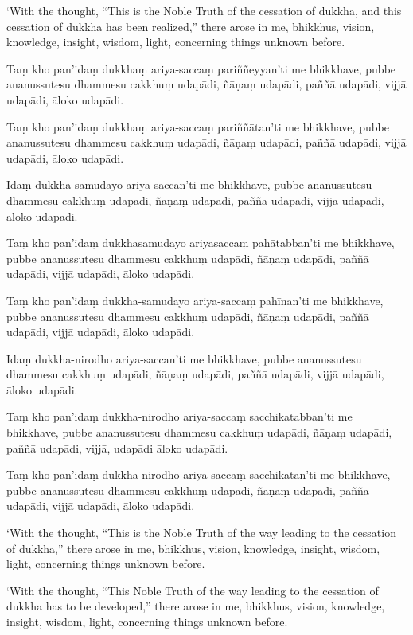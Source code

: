 ‘With the thought, “This is the Noble Truth of the cessation of dukkha,
and this cessation of dukkha has been realized,” there arose in me,
bhikkhus, vision, knowledge, insight, wisdom, light, concerning things
unknown before.

\clearpage

\paliText
\markboth{\paliTitle}{\rightmark}

Taṃ kho pan'idaṃ dukkhaṃ ariya-saccaṃ pariññeyyan'ti me bhikkhave, pubbe
ananussutesu dhammesu cakkhuṃ udapādi, ñāṇaṃ udapādi, paññā udapādi,
vijjā udapādi, āloko udapādi.

Taṃ kho pan'idaṃ dukkhaṃ ariya-saccaṃ pariññātan'ti me bhikkhave, pubbe
ananussutesu dhammesu cakkhuṃ udapādi, ñāṇaṃ udapādi, paññā udapādi,
vijjā udapādi, āloko udapādi.

Idaṃ dukkha-samudayo ariya-saccan'ti me bhikkhave, pubbe ananussutesu
dhammesu cakkhuṃ udapādi, ñāṇaṃ udapādi, paññā udapādi, vijjā udapādi,
āloko udapādi.

Taṃ kho pan'idaṃ dukkhasamudayo ariyasaccaṃ pahātabban'ti me bhikkhave,
pubbe ananussutesu dhammesu cakkhuṃ udapādi, ñāṇaṃ udapādi, paññā
udapādi, vijjā udapādi, āloko udapādi.

Taṃ kho pan'idaṃ dukkha-samudayo ariya-saccaṃ pahīnan'ti me bhikkhave, pubbe
ananussutesu dhammesu cakkhuṃ udapādi, ñāṇaṃ udapādi, paññā udapādi,
vijjā udapādi, āloko udapādi.

Idaṃ dukkha-nirodho ariya-saccan'ti me bhikkhave, pubbe ananussutesu
dhammesu cakkhuṃ udapādi, ñāṇaṃ udapādi, paññā udapādi, vijjā udapādi,
āloko udapādi.

Taṃ kho pan'idaṃ dukkha-nirodho ariya-saccaṃ sacchikātabban'ti me bhikkhave,
pubbe ananussutesu dhammesu cakkhuṃ udapādi, ñāṇaṃ udapādi, paññā
udapādi, vijjā, udapādi āloko udapādi.

Taṃ kho pan'idaṃ dukkha-nirodho ariya-saccaṃ sacchikatan'ti me bhikkhave,
pubbe ananussutesu dhammesu cakkhuṃ udapādi, ñāṇaṃ udapādi, paññā
udapādi, vijjā udapādi, āloko udapādi.

\clearpage

\englishText
\markboth{\englishTitle}{\rightmark}

‘With the thought, “This is the Noble Truth of the way leading to the
cessation of dukkha,” there arose in me, bhikkhus, vision, knowledge,
insight, wisdom, light, concerning things unknown before.

‘With the thought, “This Noble Truth of the way leading to the cessation
of dukkha has to be developed,” there arose in me, bhikkhus, vision,
knowledge, insight, wisdom, light, concerning things unknown before.

